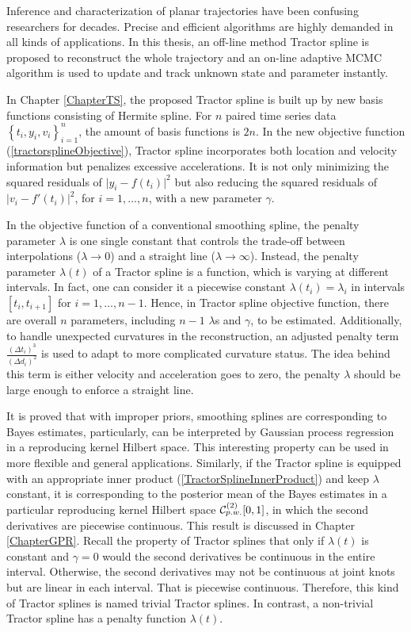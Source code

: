 
Inference and characterization of planar trajectories have been confusing researchers for decades. Precise and efficient algorithms are highly demanded in all kinds of applications. In this thesis, an off-line method Tractor spline is proposed to reconstruct the whole trajectory and an on-line adaptive MCMC algorithm is used to update and track unknown state and parameter instantly. 

In Chapter \ref{ChapterTS}, the proposed Tractor spline is built up by new basis functions consisting of Hermite spline. For $n$ paired time series data $\left\lbrace t_i,y_i,v_i\right\rbrace_{i=1}^{n}$, the amount of basis functions is $2n$. In the new objective function (\ref{tractorsplineObjective}), Tractor spline incorporates both location and velocity information but penalizes excessive accelerations. It is not only minimizing the squared residuals of $\lvert y_i-f(t_i)\rvert^2$ but also reducing the squared residuals of $\lvert v_i-f'(t_i)\rvert^2$, for $i=1,\ldots,n$, with a new parameter $\gamma$. 

In the objective function of a conventional smoothing spline, the penalty parameter $\lambda$ is one single constant that controls the trade-off between interpolations ($\lambda\to 0$) and a straight line ($\lambda\to \infty$). Instead, the penalty parameter $\lambda(t)$ of a Tractor spline is a function, which is varying at different intervals. In fact, one can consider it a piecewise constant $\lambda(t_i)=\lambda_i$ in intervals $[t_i,t_{i+1}]$ for $i=1,\ldots,n-1$. Hence, in Tractor spline objective function, there are overall $n$ parameters, including $n-1$ $\lambda$s and $\gamma$, to be estimated. Additionally, to handle unexpected curvatures in the reconstruction, an adjusted penalty term $\frac{(\Delta t_i)^3}{(\Delta d_i)^2}$ is used to adapt to more complicated curvature status. The idea behind this term is either velocity and acceleration goes to zero, the penalty $\lambda$ should be large enough to enforce a straight line. 

It is proved that with improper priors, smoothing splines are corresponding to Bayes estimates, particularly, can be interpreted by Gaussian process regression in a reproducing kernel Hilbert space. This interesting property can be used in more flexible and general applications. Similarly, if the Tractor spline is equipped with an appropriate inner product (\ref{TractorSplineInnerProduct}) and keep $\lambda$ constant, it is corresponding to the posterior mean of the Bayes estimates in a particular reproducing kernel Hilbert space $\mathcal{C}_{\scriptsize p.w.}^{(2)}[0,1]$, in which the second derivatives are piecewise continuous. This result is discussed in Chapter \ref{ChapterGPR}. Recall the property of Tractor splines that only if $\lambda(t)$ is constant and $\gamma=0$ would the second derivatives be continuous in the entire interval. Otherwise, the second derivatives may not be continuous at joint knots but are linear in each interval. That is piecewise continuous. Therefore, this kind of Tractor splines is named trivial Tractor splines. In contrast, a non-trivial Tractor spline has a penalty function $\lambda(t)$. 

